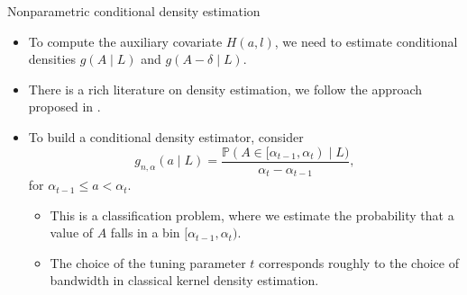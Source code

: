 \documentclass{beamer}
\newcommand{\pr}{\mathbb{P}}
\begin{document}
\begin{frame}[c]{Nonparametric conditional density estimation}

\begin{center}
\begin{itemize}
  \itemsep8pt
  \item To compute the auxiliary covariate $H(a,l)$, we need to estimate
    conditional densities $g(A \mid L)$ and $g(A - \delta \mid L)$.
  \item There is a rich literature on density estimation, we follow the approach
    proposed in \cite{diaz2011super}.
  \item To build a conditional density estimator, consider
    \begin{equation*}
      g_{n, \alpha}(a \mid L) = \frac{\pr (A \in [\alpha_{t-1}, \alpha_t)
        \mid L)}{\alpha_t - \alpha_{t-1}},
    \end{equation*}
    for $\alpha_{t-1} \leq a < \alpha_t$.
    \vspace{0.5em}
    \begin{itemize}
      \itemsep4pt
      \item This is a classification problem, where we estimate the probability
        that a value of $A$ falls in a bin $[\alpha_{t-1}, \alpha_t)$.
      \item The choice of the tuning parameter $t$ corresponds roughly to the
        choice of bandwidth in classical kernel density estimation.
    \end{itemize}
\end{itemize}
\end{center}

\note{
}

\end{frame}

\end{document}
